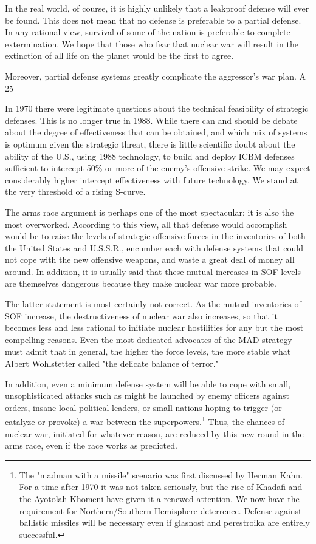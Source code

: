In the real world, of course, it is highly unlikely that a leakproof defense will ever be found. This does not mean that no defense is preferable to a partial defense. In any rational view, survival of some of the nation is preferable to complete extermination. We hope that those who fear that nuclear war will result in the extinction of all life on the planet would be the first to agree.

Moreover, partial defense systems greatly complicate the aggressor's war plan. A 25%

In 1970 there were legitimate questions about the technical feasibility of strategic defenses. This is no longer true in 1988. While there can and should be debate about the degree of effectiveness that can be obtained, and which mix of systems is optimum given the strategic threat, there is little scientific doubt about the ability of the U.S., using 1988 technology, to build and deploy ICBM defenses sufficient to intercept 50\% or more of the enemy's offensive strike. We may expect considerably higher intercept effectiveness with future technology. We stand at the very threshold of a rising S-curve.

The arms race argument is perhaps one of the most spectacular; it is also the most overworked. According to this view, all that defense would accomplish would be to raise the levels of strategic offensive forces in the inventories of both the United States and U.S.S.R., encumber each with defense systems that could not cope with the new offensive weapons, and waste a great deal of money all around. In addition, it is usually said that these mutual increases in SOF levels are themselves dangerous because they make nuclear war more probable.

The latter statement is most certainly not correct. As the mutual inventories of SOF increase, the destructiveness of nuclear war also increases, so that it becomes less and less rational to initiate nuclear hostilities for any but the most compelling reasons. Even the most dedicated advocates of the MAD strategy must admit that in general, the higher the force levels, the more stable what Albert Wohlstetter called "the delicate balance of terror."

In addition, even a minimum defense system will be able to cope with small, unsophisticated attacks such as might be launched by enemy officers against orders, insane local political leaders, or small nations hoping to trigger (or catalyze or provoke) a war between the superpowers.\footnote{
The "madman with a missile" scenario was first discussed by Herman Kahn. For a time after 1970 it was not taken seriously, but the rise of Khadafi and the Ayotolah Khomeni have given it a renewed attention. We now have the requirement for Northern/Southern Hemisphere deterrence. Defense against ballistic missiles will be necessary even if glasnost and perestroika are entirely successful.
}
Thus, the chances of nuclear war, initiated for whatever reason, are reduced by this new round in the arms race, even if the race works as predicted.

